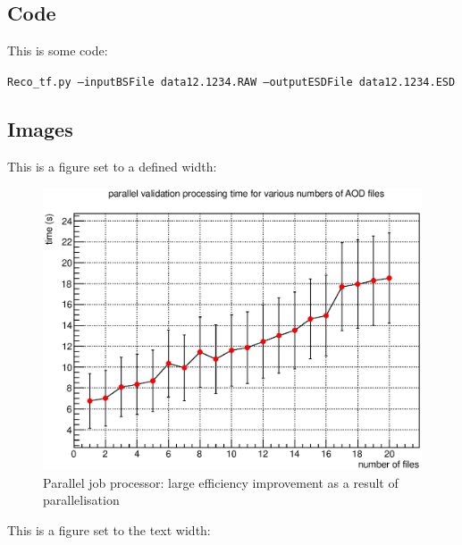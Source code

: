 \subsection{Code}

This is some code:

\begin{center}
\footnotesize\texttt{Reco\_tf.py --inputBSFile data12.1234.RAW --outputESDFile data12.1234.ESD}
\end{center}

\subsection{Images}

This is a figure set to a defined width:

\begin{figure}[H]
\begin{center}
\includegraphics[width=\measureUSpecification]{images/2014-04-10_1.eps}
\end{center}
\caption{Parallel job processor: large efficiency improvement as a result of parallelisation}
\end{figure}

This is a figure set to the text width:

